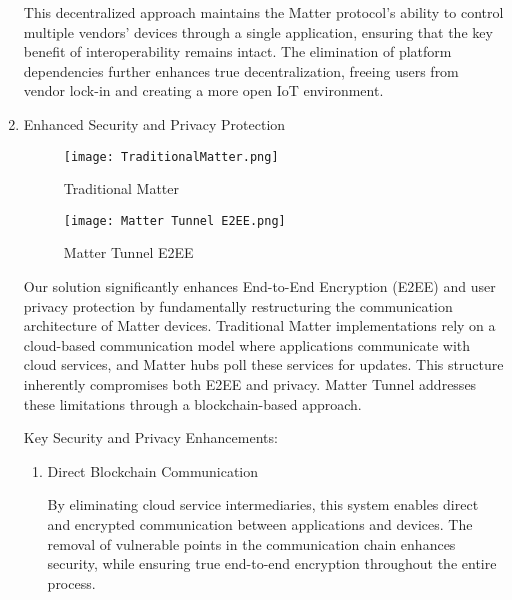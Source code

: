 \documentclass[conference]{IEEEtran}
\begin{document}
\begin{enumerate}[itemsep=2ex, parsep=1ex]
	      This decentralized approach maintains the Matter protocol's ability to control
	      multiple vendors' devices through a single application, ensuring that the key
	      benefit of interoperability remains intact. The elimination of platform
	      dependencies further enhances true decentralization, freeing users from vendor
	      lock-in and creating a more open IoT environment.
	      
	      \vspace{7cm}
	      	      
	\item Enhanced Security and Privacy Protection
	      	      
	      \begin{figure}[h!]
	      	\centering
	      	\texttt{[image: TraditionalMatter.png]}
	      	\caption{Traditional Matter}
	      	\label{fig:TraditionalMatter}
	      \end{figure}
	      	      
	      \begin{figure}[h!]
	      	\centering
	      	\texttt{[image: Matter Tunnel E2EE.png]}
	      	\caption{Matter Tunnel E2EE}
	      	\label{fig:MatterTunnelE2EE}
	      \end{figure}
	      	      
	      Our solution significantly enhances End-to-End Encryption (E2EE) and user
	      privacy protection by fundamentally restructuring the communication
	      architecture of Matter devices. Traditional Matter implementations rely on
	      a cloud-based communication model where applications communicate with cloud
	      services, and Matter hubs poll these services for updates. This structure inherently
	      compromises both E2EE and privacy. Matter Tunnel addresses these
	      limitations through a blockchain-based approach.
	      	      
	      Key Security and Privacy Enhancements:
	      	      
	      \begin{enumerate}[itemsep=2ex, parsep=1ex]
	      	\item Direct Blockchain Communication
	      	      	      	      
	      	      By eliminating cloud service intermediaries, this system enables direct
	      	      and encrypted communication between applications and devices. The
	      	      removal of vulnerable points in the communication chain enhances
	      	      security, while ensuring true end-to-end encryption throughout the entire
	      	      process.
	      	      	      	      

\end{enumerate}
\end{enumerate}
\end{document}
